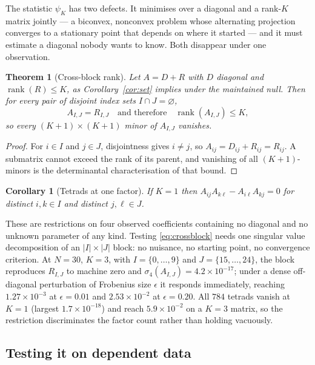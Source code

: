 \documentclass[10pt,twocolumn]{article}
\newtheorem{theorem}{Theorem}
\newtheorem{corollary}{Corollary}
\theoremstyle{remark}
\newcommand{\rank}{\operatorname{rank}}
\begin{document}
The statistic $\psi_K$ has two defects. It minimises over a diagonal and a
rank-$K$ matrix jointly --- a biconvex, nonconvex problem whose alternating
projection converges to a stationary point that depends on where it started ---
and it must estimate a diagonal nobody wants to know. Both disappear under one
observation.

\begin{theorem}[Cross-block rank]
\label{thm:crossblock}
Let $A=D+R$ with $D$ diagonal and $\rank(R)\le K$, as
Corollary~\ref{cor:set} implies under the maintained null. Then for every pair
of \emph{disjoint} index sets $I\cap J=\varnothing$,
\begin{equation}
A_{I,J}=R_{I,J}\quad\text{and therefore}\quad\rank(A_{I,J})\le K,
\label{eq:crossblock}
\end{equation}
so every $(K+1)\times(K+1)$ minor of $A_{I,J}$ vanishes.
\end{theorem}

\begin{proof}
For $i\in I$ and $j\in J$, disjointness gives $i\ne j$, so
$A_{ij}=D_{ij}+R_{ij}=R_{ij}$. A submatrix cannot exceed the rank of its
parent, and vanishing of all $(K+1)$-minors is the determinantal
characterisation of that bound.
\end{proof}

\begin{corollary}[Tetrads at one factor]
\label{cor:tetrad}
If $K=1$ then $A_{ij}A_{k\ell}-A_{i\ell}A_{kj}=0$ for distinct $i,k\in I$ and
distinct $j,\ell\in J$.
\end{corollary}

These are restrictions on four observed coefficients containing no diagonal and
no unknown parameter of any kind. Testing \eqref{eq:crossblock} needs one
singular value decomposition of an $\lvert I\rvert\times\lvert J\rvert$ block:
no nuisance, no starting point, no convergence criterion. At $N=30$, $K=3$,
with $I=\{0,\dots,9\}$ and $J=\{15,\dots,24\}$, the block reproduces $R_{I,J}$
to machine zero and $\sigma_4(A_{I,J})=4.2\times10^{-17}$; under a dense
off-diagonal perturbation of Frobenius size $\epsilon$ it responds immediately,
reaching $1.27\times10^{-3}$ at $\epsilon=0.01$ and $2.53\times10^{-2}$ at
$\epsilon=0.20$. All $784$ tetrads vanish at $K=1$ (largest
$1.7\times10^{-18}$) and reach $5.9\times10^{-2}$ on a $K=3$ matrix, so the
restriction discriminates the factor count rather than holding vacuously.

\subsection{Testing it on dependent data}
\label{sec:xbinference}
\end{document}
